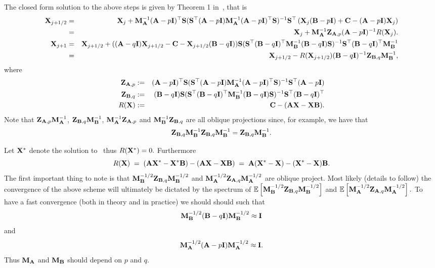 \documentclass[10pt]{article}
\makeatletter
\renewcommand*{\eqref}[1]{%
  \hyperref[{#1}]{\textup{\tagform@{\ref*{#1}}}}%
}
\theoremstyle{definition}
\makeatother
\begin{document}
The closed form solution to the above steps is given by Theorem 1 in~\cite{Gower2016}, that is
\begin{eqnarray}
{\bf X}_{j+1/2} &=& {\bf X}_{j} +{\bf M}_{{\bf A}}^{-1}({\bf A} - p {\bf I})^\top {\bf S}({\bf S}^\top  ({\bf A} - p {\bf I}) {\bf M}_{{\bf A}}^{-1}({\bf A} - p {\bf I})^\top {\bf S})^{-1}{\bf S}^\top \left( {\bf X}_j({\bf B} - p{\bf I}) + {\bf C} - ({\bf A} - p {\bf I}) {\bf X}_j\right) \nonumber\\
& =& {\bf X}_{j} +{\bf M}_{{\bf A}}^{-1} {\bf Z}_{{\bf A},p}({\bf A} - p {\bf I})^{-1} R({\bf X}_j). \\
 {\bf X}_{j+1} &=& {\bf X}_{j+1/2} +(({\bf A}-  q {\bf I}) {\bf X}_{j+1/2}  - {\bf C} -{\bf X}_{j+1/2}({\bf B} -q {\bf I}) ){\bf S}({\bf S}^\top  ({\bf B} -q {\bf I})^\top  {\bf M}_{{\bf B}}^{-1}({\bf B} -q {\bf I}) {\bf S})^{-1}{\bf S}^\top  ({\bf B} -q {\bf I})^\top {\bf M}_{{\bf B}}^{-1} \nonumber \\
 &=& {\bf X}_{j+1/2} -R({\bf X}_{j+1/2} ) ({\bf B} -q {\bf I})^{-1}{\bf Z}_{{\bf B},q} {\bf M}_{{\bf B}}^{-1},
\end{eqnarray}
where
\begin{eqnarray}
{\bf Z}_{{\bf A},p} &:=& ({\bf A} - p {\bf I})^\top {\bf S}({\bf S}^\top  ({\bf A} - p {\bf I}) {\bf M}_{{\bf A}}^{-1}({\bf A} - p {\bf I})^\top {\bf S})^{-1}{\bf S}^\top ({\bf A} - p {\bf I}) \\
{\bf Z}_{{\bf B},q}  &:= & ({\bf B} -q {\bf I}) {\bf S}({\bf S}^\top  ({\bf B} -q {\bf I})^\top {\bf M}_{{\bf B}}^{-1}({\bf B} -q {\bf I}) {\bf S})^{-1}{\bf S}^\top  ({\bf B} -q {\bf I})^\top \\
R({\bf X}) & :=&  {\bf C} -({\bf A}  {\bf X} -{\bf X}{\bf B}  ).
\end{eqnarray}
Note that ${\bf Z}_{{\bf A},p}{\bf M}_{{\bf A}}^{-1}$, ${\bf Z}_{{\bf B},q}{\bf M}_{{\bf B}}^{-1}$, ${\bf M}_{{\bf A}}^{-1}{\bf Z}_{{\bf A},p}$ and ${\bf M}_{{\bf B}}^{-1}{\bf Z}_{{\bf B},q}$ are all oblique projections since, for example, we have that
\[{\bf Z}_{{\bf B},q}{\bf M}_{{\bf B}}^{-1}{\bf Z}_{{\bf B},q}{\bf M}_{{\bf B}}^{-1} = {\bf Z}_{{\bf B},q}{\bf M}_{{\bf B}}^{-1} .\]


Let ${\bf X}^*$ denote the solution to~\eqref{eq:sylvester} thus  $R({\bf X}^*) = 0  .$ Furthermore
\begin{equation}
R({\bf X}) \; =\; ({\bf A}  {\bf X}^* -{\bf X}^*{\bf B}  ) -({\bf A}  {\bf X} -{\bf X}{\bf B}  ) \; =\; {\bf A}({\bf X}^* -{\bf X}) -({\bf X}^* -{\bf X}){\bf B}.
\end{equation}
The first important thing to note is that ${\bf M}_{{\bf B}}^{-1/2}{\bf Z}_{{\bf B},q}{\bf M}_{{\bf B}}^{-1/2}$ and ${\bf M}_{{\bf A}}^{-1/2}{\bf Z}_{{\bf A},q}{\bf M}_{{\bf A}}^{-1/2}$ are oblique project. Most likely (details to follow) the convergence of the above scheme will ultimately be dictated by the spectrum of $\mathbb{E}\left[{\bf M}_{{\bf B}}^{-1/2}{\bf Z}_{{\bf B},q}{\bf M}_{{\bf B}}^{-1/2}\right]$ and $\mathbb{E}\left[{\bf M}_{{\bf A}}^{-1/2}{\bf Z}_{{\bf A},q}{\bf M}_{{\bf A}}^{-1/2}\right].$ To have a fast convergence (both in theory and in practice) we should should such that
\[{\bf M}_{{\bf B}}^{-1/2} ({\bf B} -q{\bf I}){\bf M}_{{\bf B}}^{-1/2} \approx {\bf I} \]
and
\[{\bf M}_{{\bf A}}^{-1/2} ({\bf A} -p{\bf I}){\bf M}_{{\bf A}}^{-1/2} \approx {\bf I}. \]
Thus ${\bf M}_{{\bf A}}$ and ${\bf M}_{{\bf B}}$ should depend on $p$ and $q$.
\end{document}
